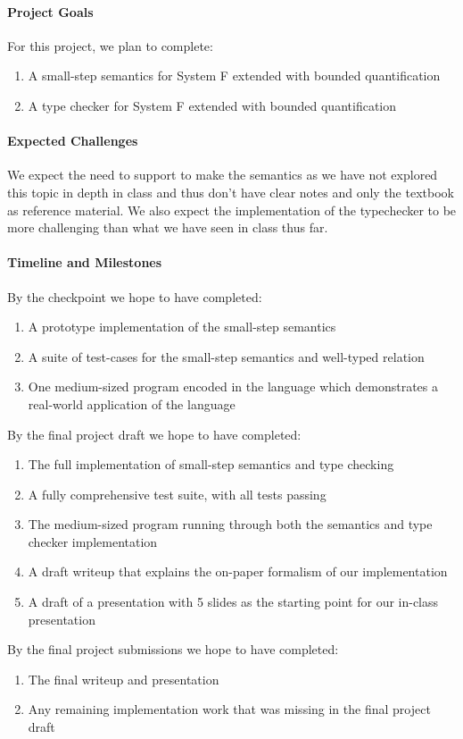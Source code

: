 \documentclass{article}
\begin{document}
\paragraph{Project Goals}

For this project, we plan to complete:
\begin{enumerate}
\item A small-step semantics for System F extended with bounded quantification
\item A type checker for System F extended with bounded quantification
\end{enumerate}

\paragraph{Expected Challenges}

We expect the need to support to make the semantics as we have not explored this topic in depth in class and thus don't have clear notes and only the textbook as reference material. We also expect the implementation of the typechecker to be more challenging than what we have seen in class thus far.

\paragraph{Timeline and Milestones}

By the checkpoint we hope to have completed:
\begin{enumerate}
\item A prototype implementation of the small-step semantics
\item A suite of test-cases for the small-step semantics and well-typed relation
\item One medium-sized program encoded in the language which demonstrates a
real-world application of the language
\end{enumerate}

\noindent
By the final project draft we hope to have completed:
\begin{enumerate}
\item The full implementation of small-step semantics and type checking
\item A fully comprehensive test suite, with all tests passing
\item The medium-sized program running through both the semantics and type
checker implementation
\item A draft writeup that explains the on-paper formalism of our
implementation
\item A draft of a presentation with 5 slides as the starting point for our
in-class presentation
\end{enumerate}

\noindent
By the final project submissions we hope to have completed:
\begin{enumerate}
\item The final writeup and presentation
\item Any remaining implementation work that was missing in the final project
draft
\end{enumerate}
\end{document}
